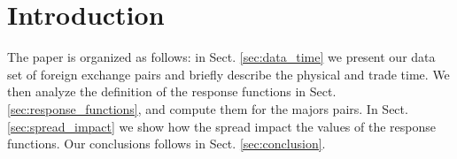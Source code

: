 \section{Introduction}\label{sec:introduction}

The paper is organized as follows: in Sect. \ref{sec:data_time} we present our
data set of foreign exchange pairs and briefly describe the physical and trade time. We then
analyze the definition of the response functions in Sect.
\ref{sec:response_functions}, and compute them for the majors pairs.
In Sect. \ref{sec:spread_impact} we show how the spread impact the values of the
response functions. Our conclusions follows in Sect. \ref{sec:conclusion}.